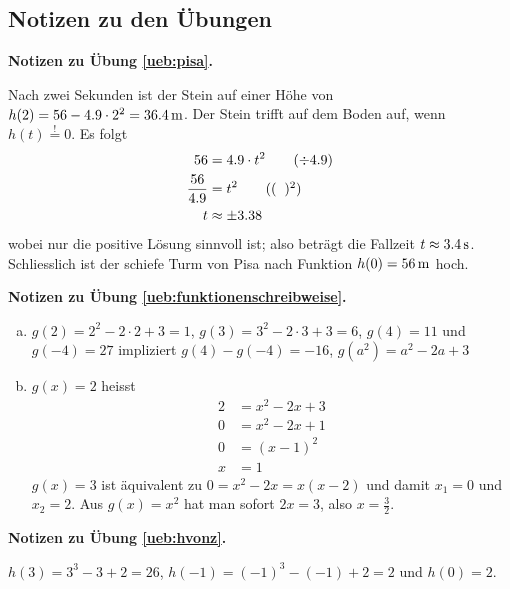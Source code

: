 \documentclass[%
11pt,%
twoside,%
titlepage,%
swissgerman,%
headsepline%
]{scrartcl}
\newcommand{\faReturnGray}{\textcolor{gray}{\faMailReply}} %
\theoremstyle{definition}
\theoremstyle{plain}
\newcommand{\concatueb}[1]{ueb:#1}%
\newcommand{\concatlsg}[1]{lsg:#1}%
\newenvironment{lsg}[1]{%
    \par\noindent\textbf{Notizen zu Übung \ref{\concatueb{#1}}.}%
    \label{\concatlsg{#1}} %
    \hfill\hyperref[\concatueb{#1}]{\faReturnGray}\par %
}{%
    \par%
}
\begin{document}
\clearpage

\subsection{Notizen zu den Übungen}

\begin{lsg}{pisa}
	Nach zwei Sekunden ist der Stein auf einer H\"ohe von $h(2)=56-4.9\cdot2^{2}=\unit[36.4]{m}$. Der Stein trifft auf dem Boden auf, wenn $h(t)\stackrel{!}{=}0$. Es folgt
	\begin{align*}
		56&=4.9\cdot t^{2}\tag{$\div4.9$}\\
		\frac{56}{4.9} &= t^{2}\tag{$(\phantom{x})^{2}$}\\
		t &\approx \pm3.38
	\end{align*}
	wobei nur die positive L\"osung sinnvoll ist; also betr\"agt die Fallzeit $t\approx\unit[3.4]{s}$. Schliesslich ist der schiefe Turm von Pisa nach Funktion $h(0)=\unit[56]{m}$ hoch.
\end{lsg}
\begin{lsg}{funktionenschreibweise}
	\begin{enumerate}[a)]
		\item $g(2)=2^{2}-2\cdot2+3=1$, $g(3)=3^{2}-2\cdot3+3=6$, $g(4)=11$ und $g(-4)=27$ impliziert $g(4)-g(-4)=-16$, $g(a^{2})=a^{2}-2a+3$
		\item $g(x)=2$ heisst
		\begin{align*}
			2 &= x^{2}-2x+3\tag{$-2$}\\
			0 &= x^{2}-2x+1\\
			0 &= (x-1)^{2}\\
			x &= 1
		\end{align*}
		$g(x)=3$ ist \"aquivalent zu $0=x^{2}-2x=x(x-2)$ und damit $x_1=0$ und $x_{2}=2$. Aus  $g(x)=x^{2}$ hat man sofort $2x=3$, also $x=\frac{3}{2}$.
	\end{enumerate}
\end{lsg}
\begin{lsg}{hvonz}
	$h(3)=3^{3}-3+2=26$, $h(-1)=(-1)^{3}-(-1)+2=2$ und $h(0)=2$.
\end{lsg}
\end{document}
